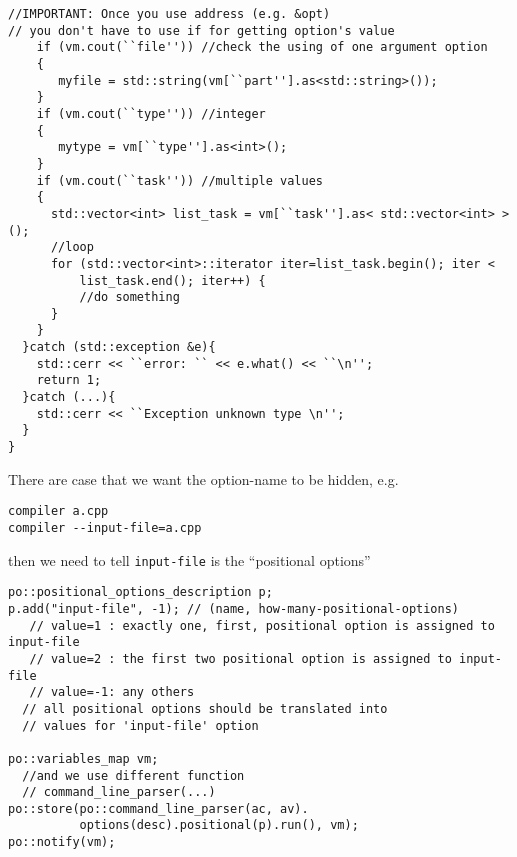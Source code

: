 {\begin{verbatim}
//IMPORTANT: Once you use address (e.g. &opt)
// you don't have to use if for getting option's value    
    if (vm.cout(``file'')) //check the using of one argument option
    {
       myfile = std::string(vm[``part''].as<std::string>());
    }
    if (vm.cout(``type'')) //integer
    {
       mytype = vm[``type''].as<int>();
    }
    if (vm.cout(``task'')) //multiple values
    {
      std::vector<int> list_task = vm[``task''].as< std::vector<int> >();
      //loop
      for (std::vector<int>::iterator iter=list_task.begin(); iter <
          list_task.end(); iter++) {
          //do something
      } 
    }
  }catch (std::exception &e){
    std::cerr << ``error: `` << e.what() << ``\n'';
    return 1;
  }catch (...){
    std::cerr << ``Exception unknown type \n'';
  }
}
\end{verbatim}}

There are case that we want the option-name to be hidden, e.g.
\begin{verbatim}
compiler a.cpp
compiler --input-file=a.cpp
\end{verbatim}
then we need to tell \verb!input-file! is the ``positional options''
\begin{verbatim}
po::positional_options_description p;
p.add("input-file", -1); // (name, how-many-positional-options)
   // value=1 : exactly one, first, positional option is assigned to input-file
   // value=2 : the first two positional option is assigned to input-file
   // value=-1: any others 
  // all positional options should be translated into 
  // values for 'input-file' option

po::variables_map vm;
  //and we use different function
  // command_line_parser(...)
po::store(po::command_line_parser(ac, av).
          options(desc).positional(p).run(), vm);
po::notify(vm);
\end{verbatim}

